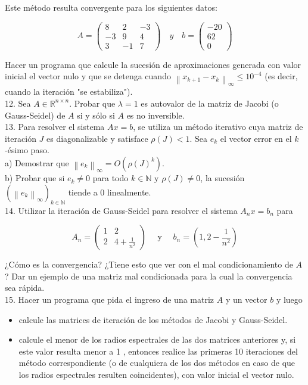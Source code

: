 \documentclass[10pt]{book}
\begin{document}
Este método resulta convergente para los siguientes datos:

$$
A=\left(\begin{array}{ccc}
8 & 2 & -3 \\
-3 & 9 & 4 \\
3 & -1 & 7
\end{array}\right) \quad y \quad b=\left(\begin{array}{c}
-20 \\
62 \\
0
\end{array}\right)
$$

Hacer un programa que calcule la sucesión de aproximaciones generada con valor inicial el vector nulo y que se detenga cuando $\left\|x_{k+1}-x_{k}\right\|_{\infty} \leq 10^{-4}$ (es decir, cuando la iteración "se estabiliza").\\
12. Sea $A \in \mathbb{R}^{n \times n}$. Probar que $\lambda=1$ es autovalor de la matriz de Jacobi (o Gauss-Seidel) de $A$ si y sólo si $A$ es no inversible.\\
13. Para resolver el sistema $A x=b$, se utiliza un método iterativo cuya matriz de iteración $J$ es diagonalizable y satisface $\rho(J)<1$. Sea $e_{k}$ el vector error en el $k$-ésimo paso.\\
a) Demostrar que $\left\|e_{k}\right\|_{\infty}=O\left(\rho(J)^{k}\right)$.\\
b) Probar que si $e_{k} \neq 0$ para todo $k \in \mathbb{N}$ y $\rho(J) \neq 0$, la sucesión $\left(\left\|e_{k}\right\|_{\infty}\right)_{k \in \mathbb{N}}$ tiende a 0 linealmente.\\
14. Utilizar la iteración de Gauss-Seidel para resolver el sistema $A_{n} x=b_{n}$ para

$$
A_{n}=\left(\begin{array}{cc}
1 & 2 \\
2 & 4+\frac{1}{n^{2}}
\end{array}\right) \quad \text { y } \quad b_{n}=\left(1,2-\frac{1}{n^{2}}\right)
$$

¿Cómo es la convergencia? ¿Tiene esto que ver con el mal condicionamiento de $A$ ? Dar un ejemplo de una matriz mal condicionada para la cual la convergencia sea rápida.\\
15. Hacer un programa que pida el ingreso de una matriz $A$ y un vector $b$ y luego

\begin{itemize}
  \item calcule las matrices de iteración de los métodos de Jacobi y Gauss-Seidel.
  \item calcule el menor de los radios espectrales de las dos matrices anteriores y, si este valor resulta menor a 1 , entonces realice las primeras 10 iteraciones del método correspondiente (o de cualquiera de los dos métodos en caso de que los radios espectrales resulten coincidentes), con valor inicial el vector nulo.
\end{itemize}
\end{document}
